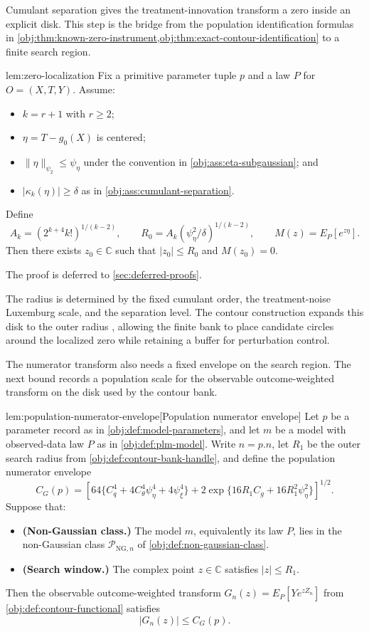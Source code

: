 \documentclass[11pt]{article}
\begin{document}
Cumulant separation gives the treatment-innovation transform a zero inside an explicit disk. This step is the bridge from the population identification formulas in \cref{obj:thm:known-zero-instrument,obj:thm:exact-contour-identification} to a finite search region.

\begin{lemmav}{lem:zero-localization}
Fix a primitive parameter tuple \(p\) and a law \(P\) for \(O=(X,T,Y)\). Assume:
\begin{itemize}
\item \(k=r+1\) with \(r\ge2\);
\item \(\eta=T-g_0(X)\) is centered;
\item \(\|\eta\|_{\psi_2}\le\psi_{\eta}\) under the convention in \cref{obj:ass:eta-subgaussian}; and
\item \(|\kappa_k(\eta)|\ge\delta\) as in \cref{obj:ass:cumulant-separation}.
\end{itemize}
Define
\[
A_k=(2^{k+4}k!)^{1/(k-2)},\qquad
R_0=A_k(\psi_{\eta}^2/\delta)^{1/(k-2)},\qquad
M(z)=E_P[e^{z\eta}].
\]
Then there exists \(z_0\in\mathbb C\) such that \(|z_0|\le R_0\) and \(M(z_0)=0\).
\end{lemmav}

The proof is deferred to \cref{sec:deferred-proofs}.

The radius  is determined by the fixed cumulant order, the treatment-noise Luxemburg scale, and the separation level. The contour construction expands this disk to the outer radius , allowing the finite bank to place candidate circles around the localized zero while retaining a buffer for perturbation control.

The numerator transform also needs a fixed envelope on the search region. The next bound records a population scale for the observable outcome-weighted transform on the disk used by the contour bank.

\begin{lemmav}{lem:population-numerator-envelope}[Population numerator envelope]
Let \(p\) be a parameter record as in \cref{obj:def:model-parameters}, and let \(m\) be a model with observed-data law \(P\) as in \cref{obj:def:plm-model}. Write \(n=p.n\), let \(R_1\) be the outer search radius from \cref{obj:def:contour-bank-handle}, and define the population numerator envelope
\[
C_G(p)
=
\left[
64\{C_q^4+4C_{\theta}^4\psi_{\eta}^4+4\psi_{\xi}^4\}
+
2\exp\{16R_1C_g+16R_1^2\psi_{\eta}^2\}
\right]^{1/2}.
\]
Suppose that:
\begin{itemize}
\item \textbf{(Non-Gaussian class.)} The model \(m\), equivalently its law \(P\), lies in the non-Gaussian class \(\mathcal P_{\mathrm{NG},n}\) of \cref{obj:def:non-gaussian-class}.
\item \textbf{(Search window.)} The complex point \(z\in\mathbb C\) satisfies \(|z|\le R_1\).
\end{itemize}
Then the observable outcome-weighted transform \(G_n(z)=E_P[Ye^{zZ_n}]\) from \cref{obj:def:contour-functional} satisfies
\[
|G_n(z)|\le C_G(p).
\]
\end{lemmav}
\end{document}
